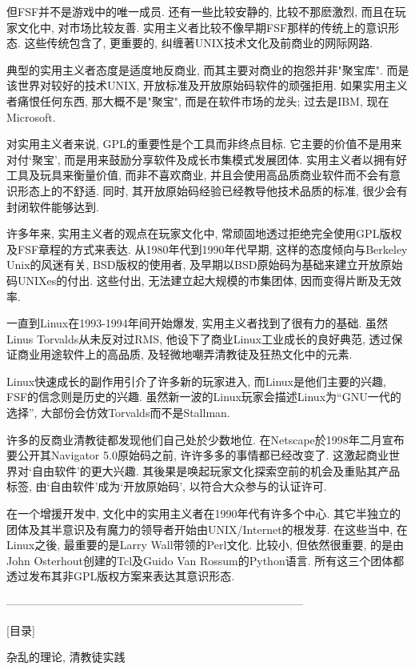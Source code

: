 \documentclass[a4paper,12pt,UTF8,twoside]{ctexbook}
\begin{document}
但FSF并不是游戏中的唯一成员. 还有一些比较安静的, 比较不那麽激烈, 而且在玩家文化中, 对市场比较友善. 实用主义者比较不像早期FSF那样的传统上的意识形态. 这些传统包含了, 更重要的, 纠缠著UNIX技术文化及前商业的网际网路.

典型的实用主义者态度是适度地反商业, 而其主要对商业的抱怨并非"聚宝库". 而是该世界对较好的技术UNIX, 开放标准及开放原始码软件的顽强拒用. 如果实用主义者痛恨任何东西, 那大概不是"聚宝", 而是在软件市场的龙头; 过去是IBM, 现在Microsoft.

对实用主义者来说, GPL的重要性是个工具而非终点目标. 它主要的价值不是用来对付`聚宝', 而是用来鼓励分享软件及成长市集模式发展团体. 实用主义者以拥有好工具及玩具来衡量价值, 而非不喜欢商业, 并且会使用高品质商业软件而不会有意识形态上的不舒适.  同时, 其开放原始码经验已经教导他技术品质的标准, 很少会有封闭软件能够达到.

许多年来, 实用主义者的观点在玩家文化中, 常顽固地透过拒绝完全使用GPL版权及FSF章程的方式来表达. 从1980年代到1990年代早期, 这样的态度倾向与Berkeley Unix的风迷有关, BSD版权的使用者, 及早期以BSD原始码为基础来建立开放原始码UNIXes的付出. 这些付出, 无法建立起大规模的市集团体, 因而变得片断及无效率.

一直到Linux在1993-1994年间开始爆发, 实用主义者找到了很有力的基础. 虽然Linus Torvalds从未反对过RMS, 他设下了商业Linux工业成长的良好典范, 透过保证商业用途软件上的高品质, 及轻微地嘲弄清教徒及狂热文化中的元素.

Linux快速成长的副作用引介了许多新的玩家进入, 而Linux是他们主要的兴趣, FSF的信念则是历史的兴趣.  虽然新一波的Linux玩家会描述Linux为``GNU一代的选择'', 大部份会仿效Torvalds而不是Stallman.

许多的反商业清教徒都发现他们自己处於少数地位. 在Netscape於1998年二月宣布要公开其Navigator 5.0原始码之前, 许许多多的事情都已经改变了. 这激起商业世界对`自由软件'的更大兴趣. 其後果是唤起玩家文化探索空前的机会及重贴其产品标签, 由`自由软件'成为`开放原始码', 以符合大众参与的认证许可.

在一个增援开发中, 文化中的实用主义者在1990年代有许多个中心. 其它半独立的团体及其半意识及有魔力的领导者开始由UNIX/Internet的根发芽. 在这些当中, 在Linux之後, 最重要的是Larry Wall带领的Perl文化. 比较小, 但依然很重要, 的是由John Osterhout创建的Tcl及Guido Van Rossum的Python语言. 所有这三个团体都透过发布其非GPL版权方案来表达其意识形态.

--------------------------------------------------------------------------------

[目录]

杂乱的理论, 清教徒实践
\end{document}
